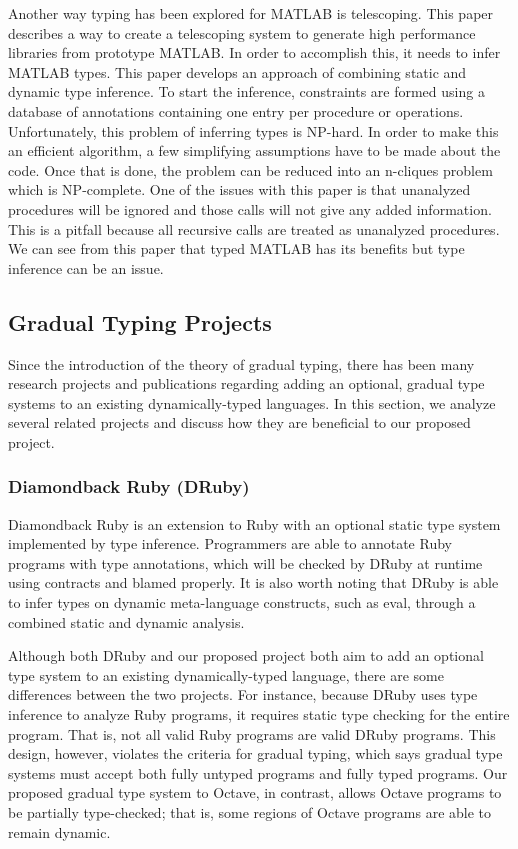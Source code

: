Another way typing has been explored for MATLAB is telescoping. This paper \cite{chauhan2003type} describes a way to create a telescoping system to generate high performance libraries from prototype MATLAB. In order to accomplish this, it needs to infer MATLAB types. This paper develops an approach of combining static and dynamic type inference. To start the inference, constraints are formed using a database of annotations containing one entry per procedure or operations. Unfortunately, this problem of inferring types is NP-hard. In order to make this an efficient algorithm, a few simplifying assumptions have to be made about the code. Once that is done, the problem can be reduced into an n-cliques problem which is NP-complete. One of the issues with this paper is that unanalyzed procedures will be ignored and those calls will not give any added information. This is a pitfall because all recursive calls are treated as unanalyzed procedures. We can see from this paper that typed MATLAB has its benefits but type inference can be an issue.

\subsection{Gradual Typing Projects}
Since the introduction of the theory of gradual typing, there has been many research projects and publications regarding adding an optional, gradual type systems to an existing dynamically-typed languages. In this section, we analyze several related projects and discuss how they are beneficial to our proposed project.

\subsubsection{Diamondback Ruby (DRuby) \cite{furr2009combining}}
Diamondback Ruby is an extension to Ruby with an optional static type system implemented by type inference. Programmers are able to annotate Ruby programs with type annotations, which will be checked by DRuby at runtime using contracts and blamed properly. It is also worth noting that DRuby is able to infer types on dynamic meta-language constructs, such as eval, through a combined static and dynamic analysis.


Although both DRuby and our proposed project both aim to add an optional type system to an existing dynamically-typed language, there are some differences between the two projects. For instance, because DRuby uses type inference to analyze Ruby programs, it requires static type checking for the entire program. That is, not all valid Ruby programs are valid DRuby programs. This design, however, violates the criteria for gradual typing, which says gradual type systems must accept both fully untyped programs and fully typed programs.  Our proposed gradual type system to Octave, in contrast, allows Octave programs to be partially type-checked; that is, some regions of Octave programs are able to remain dynamic.

